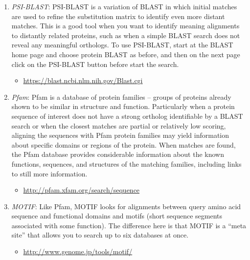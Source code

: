\begin{enumerate}
	\item \emph{PSI-BLAST}: PSI-BLAST is a variation of BLAST in which initial matches are used to refine the substitution matrix to identify even more distant matches. This is a good tool when you want to identify meaning alignments to distantly related proteins, such as when a simple BLAST search does not reveal any meaningful orthologs. To use PSI-BLAST, start at the BLAST home page and choose protein BLAST as before, and then on the next page click on the PSI-BLAST button before start the search.
	\begin{itemize}
	 \item \url{https://blast.ncbi.nlm.nih.gov/Blast.cgi}
	\end{itemize}


	\item \emph{Pfam}: Pfam is a database of protein families – groups of proteins already shown to be similar in structure and function.  Particularly when a protein sequence of interest does not have a strong ortholog identifiable by a BLAST search or when the closest matches are partial or relatively low scoring, aligning the sequences with Pfam protein families may yield information about specific domains or regions of the protein.  When matches are found, the Pfam database provides considerable information about the known functions, sequences, and structures of the matching families, including links to still more information.
	\begin{itemize}
	  \item \url{http://pfam.xfam.org/search/sequence}
	\end{itemize}

	
	\item \emph{MOTIF}: Like Pfam, MOTIF looks for alignments between query amino acid sequence and functional domains and motifs (short sequence segments associated with some function).  The difference here is that MOTIF is a “meta site” that allows you to search up to six databases at once.
	\begin{itemize}
	 \item \url{http://www.genome.jp/tools/motif/}
	\end{itemize}

	

\end{enumerate}


